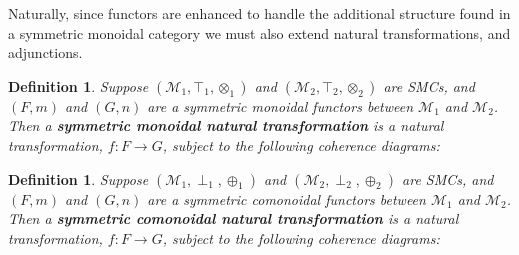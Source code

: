 \documentclass{lmcs}
\newtheorem{definition}[theorem]{Definition}
\let\mto\to
\let\to\relax
\newcommand{\to}{\rightarrow}
\newcommand{\cat}[1]{\mathcal{#1}}
\begin{document}
Naturally, since functors are enhanced to handle the additional
structure found in a symmetric monoidal category we must also extend
natural transformations, and adjunctions.
\begin{definition}
  \label{def:SMCNAT}
  Suppose $(\cat{M}_1,\top_1,\otimes_1)$ and $(\cat{M}_2,\top_2,\otimes_2)$
  are SMCs, and $(F,m)$ and $(G,n)$ are a symmetric monoidal functors
  between $\cat{M}_1$ and $\cat{M}_2$.  Then a \textbf{symmetric
    monoidal natural transformation} is a natural transformation,
  $f : F \mto G$, subject to the following coherence diagrams:
\end{definition}
\begin{definition}
  \label{def:coSMCNAT}
  Suppose $(\cat{M}_1,\perp_1,\oplus_1)$ and $(\cat{M}_2,\perp_2,\oplus_2)$
  are SMCs, and $(F,m)$ and $(G,n)$ are a symmetric comonoidal functors
  between $\cat{M}_1$ and $\cat{M}_2$.  Then a \textbf{symmetric
    comonoidal natural transformation} is a natural transformation,
  $f : F \mto G$, subject to the following coherence diagrams:
\end{definition}  
\end{document}
